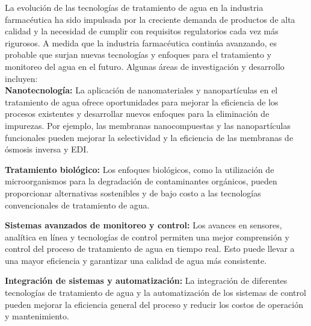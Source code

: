 La evolución de las tecnologías de tratamiento de agua en la industria farmacéutica ha sido impulsada por la creciente
demanda de productos de alta calidad y la necesidad de cumplir con requisitos regulatorios cada vez más rigurosos. A
medida que la industria farmacéutica continúa avanzando, es probable que surjan nuevas tecnologías y enfoques para el
tratamiento y monitoreo del agua en el futuro. Algunas áreas de investigación y desarrollo incluyen:\\

\textbf{Nanotecnología:} La aplicación de nanomateriales y nanopartículas en el tratamiento de agua ofrece oportunidades para
mejorar la eficiencia de los procesos existentes y desarrollar nuevos enfoques para la eliminación de impurezas. Por ejemplo,
las membranas nanocompuestas y las nanopartículas funcionales pueden mejorar la selectividad y la eficiencia de las membranas de ósmosis inversa y EDI.

\textbf{Tratamiento biológico:} Los enfoques biológicos, como la utilización de microorganismos para la degradación de contaminantes
orgánicos, pueden proporcionar alternativas sostenibles y de bajo costo a las tecnologías convencionales de tratamiento de agua.

\textbf{Sistemas avanzados de monitoreo y control:} Los avances en sensores, analítica en línea y tecnologías de control permiten
una mejor comprensión y control del proceso de tratamiento de agua en tiempo real. Esto puede llevar a una mayor eficiencia y
garantizar una calidad de agua más consistente.

\textbf{Integración de sistemas y automatización:} La integración de diferentes tecnologías de tratamiento de agua y la
automatización de los sistemas de control pueden mejorar la eficiencia general del proceso y reducir los costos de
operación y mantenimiento.



